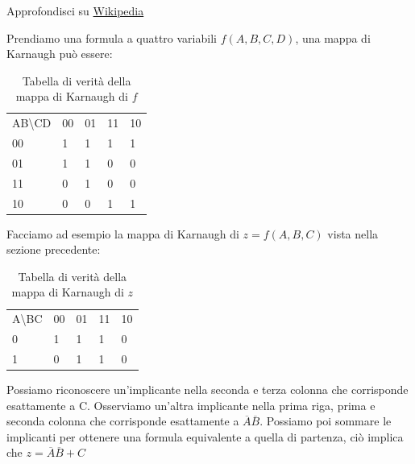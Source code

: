 Approfondisci su \href{https://en.wikipedia.org/wiki/Karnaugh_map}{Wikipedia}

Prendiamo una formula a quattro variabili $ f(A,B,C,D) $, una mappa di Karnaugh può essere:
\begin{table}[H]
	\centering
	\caption{Tabella di verità della mappa di Karnaugh di $f$}
	\label{tab:karnaugh}
	\begin{tabular}{lllll}
		AB\textbackslash{}CD    & 00                     & 01                     & 11                     & 10                     \\ \cline{2-5} 
		\multicolumn{1}{l|}{00} & \multicolumn{1}{l|}{1} & \multicolumn{1}{l|}{1} & \multicolumn{1}{l|}{1} & \multicolumn{1}{l|}{1} \\ \cline{2-5} 
		\multicolumn{1}{l|}{01} & \multicolumn{1}{l|}{1} & \multicolumn{1}{l|}{1} & \multicolumn{1}{l|}{0} & \multicolumn{1}{l|}{0} \\ \cline{2-5} 
		\multicolumn{1}{l|}{11} & \multicolumn{1}{l|}{0} & \multicolumn{1}{l|}{1} & \multicolumn{1}{l|}{0} & \multicolumn{1}{l|}{0} \\ \cline{2-5} 
		\multicolumn{1}{l|}{10} & \multicolumn{1}{l|}{0} & \multicolumn{1}{l|}{0} & \multicolumn{1}{l|}{1} & \multicolumn{1}{l|}{1} \\ \cline{2-5} 
	\end{tabular}
\end{table}

Facciamo ad esempio la mappa di Karnaugh di $ z = f(A,B,C) $ vista nella sezione precedente:

\begin{table}[H]
	\centering
	\caption{Tabella di verità della mappa di Karnaugh di $z$}
	\label{tab:karnaugh}
	\begin{tabular}{lllll}
		A\textbackslash{}BC    & 00                     & 01                     & 11                     & 10                     \\ \cline{2-5} 
		\multicolumn{1}{l|}{0} & \multicolumn{1}{l|}{1} & \multicolumn{1}{l|}{1} & \multicolumn{1}{l|}{1} & \multicolumn{1}{l|}{0} \\ \cline{2-5} 
		\multicolumn{1}{l|}{1} & \multicolumn{1}{l|}{0} & \multicolumn{1}{l|}{1} & \multicolumn{1}{l|}{1} & \multicolumn{1}{l|}{0} \\ \cline{2-5} 
	\end{tabular}
\end{table}

Possiamo riconoscere un'implicante nella seconda e terza colonna che corrisponde esattamente a C. Osserviamo un'altra implicante nella prima riga, prima e seconda colonna che corrisponde esattamente a $ \overbar{A}\overbar{B} $. Possiamo poi sommare le implicanti per ottenere una formula equivalente a quella di partenza, ciò implica che $ z =  \overbar{A}\overbar{B} + C $


